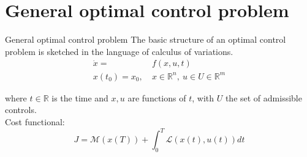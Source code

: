
\section{General optimal control problem}
\begin{frame}{General optimal control problem}
	The basic structure of an optimal control problem is sketched in the language of calculus of variations.
	\begin{align}
		\dot{x} = &f(x,u,t) \label{eq:BasicOptimalFunction} \\ 
		x(t_0) = x_0, \ &x \in \mathbb{R}^n, \ u \in U \in \mathbb{R}^m \label{eq:BasicOptimalDefinitions}
	\end{align}
	
	where $t \in \mathbb{R}$ is the time and $x,u$ are functions of $t$, with $U$ the set of admissible controls. \\
	\medskip
	Cost functional:
	\begin{equation}\label{eq:BolzaProblem}
		J = \mathcal{M}(x(T)) + \int_{0}^{T} \mathcal{L}(x(t),u(t)) dt
	\end{equation} 
\end{frame}

%
%	
%	
%	

